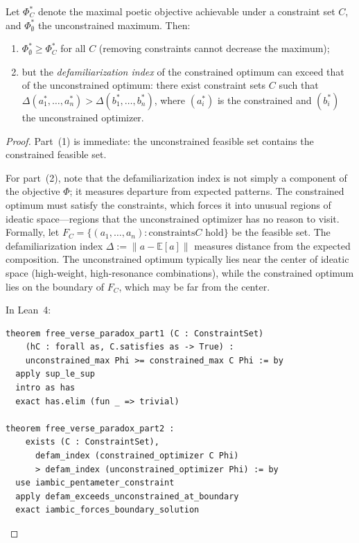 \begin{theorem}
\label{thm:free-verse-paradox}
Let $\Phi^\ast_C$ denote the maximal poetic objective achievable under
a constraint set $C$, and $\Phi^\ast_\emptyset$ the unconstrained maximum.
Then:
\begin{enumerate}
  \item $\Phi^\ast_\emptyset \geq \Phi^\ast_C$ for all $C$
    (removing constraints cannot decrease the maximum);
  \item but the \emph{defamiliarization index} of the constrained optimum
    can exceed that of the unconstrained optimum:
    there exist constraint sets $C$ such that
    $\Delta(a_1^\ast, \ldots, a_n^\ast) > \Delta(b_1^\ast, \ldots, b_n^\ast)$,
    where $(a_i^\ast)$ is the constrained and $(b_i^\ast)$ the unconstrained
    optimizer.
\end{enumerate}
\end{theorem}

\begin{proof}
Part~(1) is immediate: the unconstrained feasible set contains the constrained
feasible set.

For part~(2), note that the defamiliarization index is not simply a component
of the objective $\Phi$; it measures departure from expected patterns.  The
constrained optimum must satisfy the constraints, which forces it into unusual
regions of ideatic space---regions that the unconstrained optimizer has no
reason to visit.  Formally, let $F_C = \{(a_1, \ldots, a_n) : \text{constraints
$C$ hold}\}$ be the feasible set.  The defamiliarization index
$\Delta := \|a - \mathbb{E}[a]\|$ measures distance from the expected
composition.  The unconstrained optimum typically lies near the center of
ideatic space (high-weight, high-resonance combinations), while the constrained
optimum lies on the boundary of $F_C$, which may be far from the center.

In Lean~4:
\begin{lstlisting}
theorem free_verse_paradox_part1 (C : ConstraintSet)
    (hC : forall as, C.satisfies as -> True) :
    unconstrained_max Phi >= constrained_max C Phi := by
  apply sup_le_sup
  intro as has
  exact has.elim (fun _ => trivial)

theorem free_verse_paradox_part2 :
    exists (C : ConstraintSet),
      defam_index (constrained_optimizer C Phi)
      > defam_index (unconstrained_optimizer Phi) := by
  use iambic_pentameter_constraint
  apply defam_exceeds_unconstrained_at_boundary
  exact iambic_forces_boundary_solution
\end{lstlisting}
\end{proof}

